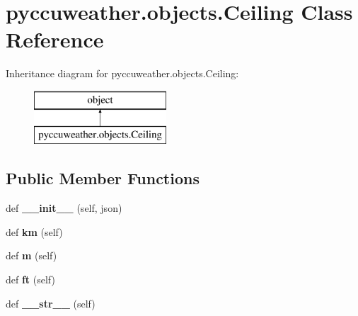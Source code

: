 \hypertarget{classpyccuweather_1_1objects_1_1_ceiling}{}\section{pyccuweather.\+objects.\+Ceiling Class Reference}
\label{classpyccuweather_1_1objects_1_1_ceiling}
Inheritance diagram for pyccuweather.\+objects.\+Ceiling\+:\begin{figure}[H]
\begin{center}
\leavevmode
\includegraphics[height=2.000000cm]{classpyccuweather_1_1objects_1_1_ceiling}
\end{center}
\end{figure}
\subsection*{Public Member Functions}
\begin{DoxyCompactItemize}
\item 
\hypertarget{classpyccuweather_1_1objects_1_1_ceiling_af7fe23b0aaf54a2fb65c3eb84ad4e1c7}{}def {\bfseries \+\_\+\+\_\+init\+\_\+\+\_\+} (self, json)\label{classpyccuweather_1_1objects_1_1_ceiling_af7fe23b0aaf54a2fb65c3eb84ad4e1c7}

\item 
\hypertarget{classpyccuweather_1_1objects_1_1_ceiling_a1d008acce4cfa083a630f90d2f7df1ed}{}def {\bfseries km} (self)\label{classpyccuweather_1_1objects_1_1_ceiling_a1d008acce4cfa083a630f90d2f7df1ed}

\item 
\hypertarget{classpyccuweather_1_1objects_1_1_ceiling_a3e0573256e81df1d015bfb639ec8f914}{}def {\bfseries m} (self)\label{classpyccuweather_1_1objects_1_1_ceiling_a3e0573256e81df1d015bfb639ec8f914}

\item 
\hypertarget{classpyccuweather_1_1objects_1_1_ceiling_a3c43f091db846ee0bac342cb48184e66}{}def {\bfseries ft} (self)\label{classpyccuweather_1_1objects_1_1_ceiling_a3c43f091db846ee0bac342cb48184e66}

\item 
\hypertarget{classpyccuweather_1_1objects_1_1_ceiling_a6a0b00a2bb4679c88a4cc6388832cdc1}{}def {\bfseries \+\_\+\+\_\+str\+\_\+\+\_\+} (self)\label{classpyccuweather_1_1objects_1_1_ceiling_a6a0b00a2bb4679c88a4cc6388832cdc1}

\end{DoxyCompactItemize}
